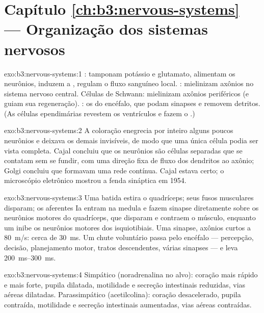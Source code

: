\section*{Capítulo \ref{ch:b3:nervous-systems} --- Organização dos sistemas nervosos}

\begin{solution}{exo:b3:nervous-systems:1}
: tamponam potássio e glutamato, alimentam os neurônios,
induzem a , regulam o fluxo sanguíneo local.
: mielinizam axônios no sistema nervoso central. Células
de Schwann: mielinizam axônios periféricos (e guiam sua regeneração).
: os  do encéfalo, que podam sinapses e removem
detritos. (As células ependimárias revestem os ventrículos e fazem o
.)
\end{solution}

\begin{solution}{exo:b3:nervous-systems:2}
A coloração enegrecia por inteiro alguns poucos neurônios e deixava os
demais invisíveis, de modo que uma única célula podia ser vista
completa. Cajal concluiu que os neurônios são células separadas que se
contatam sem se fundir, com uma direção fixa de fluxo dos dendritos ao
axônio; Golgi concluiu que formavam uma rede contínua. Cajal estava
certo; o microscópio eletrônico mostrou a fenda sináptica em 1954.
\end{solution}

\begin{solution}{exo:b3:nervous-systems:3}
Uma batida estira o quadríceps; seus fusos musculares disparam; os
aferentes Ia entram na medula e fazem sinapse diretamente sobre os
neurônios motores do quadríceps, que disparam e contraem o músculo,
enquanto um  inibe os neurônios motores dos isquiotibiais.
Uma sinapse, axônios curtos a \qty{80}{m/s}: cerca de \qty{30}{ms}. Um
chute voluntário passa pelo encéfalo --- percepção, decisão,
planejamento motor, tratos descendentes, várias sinapses --- e leva
\qtyrange{200}{300}{ms}.
\end{solution}

\begin{solution}{exo:b3:nervous-systems:4}
Simpático (noradrenalina no alvo): coração mais rápido e mais forte,
pupila dilatada, motilidade e secreção intestinais reduzidas, vias
aéreas dilatadas. Parassimpático (acetilcolina): coração desacelerado,
pupila contraída, motilidade e secreção intestinais aumentadas, vias
aéreas contraídas.
\end{solution}

